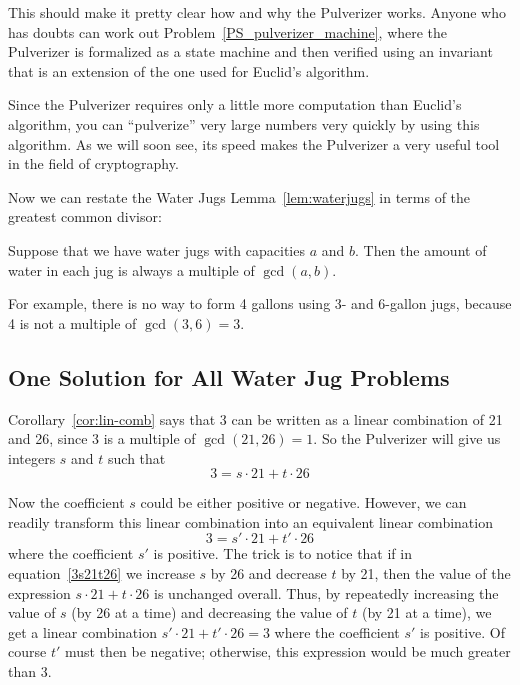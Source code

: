 This should make it pretty clear how and why the Pulverizer works.
Anyone who has doubts can work out
Problem~\ref{PS_pulverizer_machine}, where the Pulverizer is
formalized as a state machine and then verified using an invariant
that is an extension of the one used for Euclid's algorithm.

Since the Pulverizer requires only a little more computation than
Euclid's algorithm, you can ``pulverize'' very large numbers very
quickly by using this algorithm.  As we will soon see, its speed makes
the Pulverizer a very useful tool in the field of cryptography.

Now we can restate the Water Jugs Lemma~\ref{lem:waterjugs} in terms
of the greatest common divisor:
\begin{corollary}\label{cor:waterjugs}
Suppose that we have water jugs with capacities $a$ and $b$.  Then the
amount of water in each jug is always a multiple of $\gcd(a, b)$.
\end{corollary}
For example, there is no way to form 4 gallons using 3- and 6-gallon
jugs, because 4 is not a multiple of $\gcd(3, 6) = 3$.

\subsection{One Solution for All Water Jug Problems}\label{all_jugs_son_sec}

Corollary~\ref{cor:lin-comb} says that 3 can be written as a linear
combination of 21 and 26, since 3 is a multiple of $\gcd(21, 26) = 1$.
So the Pulverizer will give us integers $s$ and $t$ such that
\begin{equation}\label{3s21t26}
3 = s \cdot 21 + t \cdot 26
\end{equation}

Now the coefficient $s$ could be either positive or negative.
However, we can readily transform this linear combination into an
equivalent linear combination
\begin{equation}\label{3sprime21}
3 = s' \cdot 21 + t' \cdot 26
\end{equation}
where the coefficient $s'$ is positive.  The trick is to notice that
if in equation~\eqref{3s21t26} we increase $s$ by 26 and decrease $t$
by 21, then the value of the expression $s \cdot 21 + t \cdot 26$ is
unchanged overall.  Thus, by repeatedly increasing the value of $s$
(by 26 at a time) and decreasing the value of $t$ (by 21 at a time),
we get a linear combination $s' \cdot 21 + t' \cdot 26 = 3$ where the
coefficient $s'$ is positive.  Of course $t'$ must then be negative;
otherwise, this expression would be much greater than 3.

